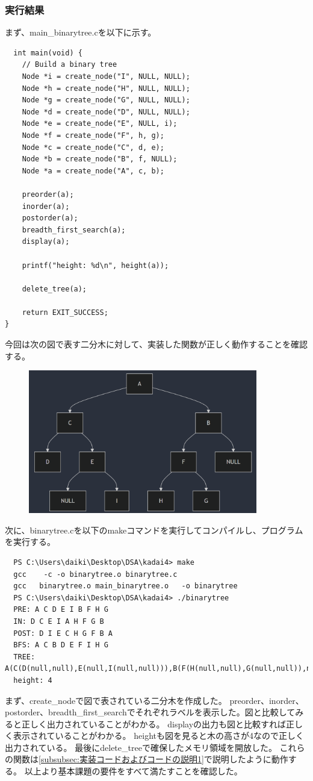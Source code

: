 \documentclass{ltjsarticle}
\begin{document}
\subsubsection{実行結果}\label{subsubsec:実行結果1}
まず、main\_binarytree.cを以下に示す。
\begin{lstlisting}
  int main(void) {
    // Build a binary tree
    Node *i = create_node("I", NULL, NULL);
    Node *h = create_node("H", NULL, NULL);
    Node *g = create_node("G", NULL, NULL);
    Node *d = create_node("D", NULL, NULL);
    Node *e = create_node("E", NULL, i);
    Node *f = create_node("F", h, g);
    Node *c = create_node("C", d, e);
    Node *b = create_node("B", f, NULL);
    Node *a = create_node("A", c, b);

    preorder(a);
    inorder(a);
    postorder(a);
    breadth_first_search(a);
    display(a);

    printf("height: %d\n", height(a));

    delete_tree(a);

    return EXIT_SUCCESS;
}
\end{lstlisting}
今回は次の図で表す二分木に対して、実装した関数が正しく動作することを確認する。
\begin{figure}[htbp]
  \begin{center}
      \includegraphics[width = 100mm]{binarytree.png}
  \end{center}
\end{figure}
次に、binarytree.cを以下のmakeコマンドを実行してコンパイルし、プログラムを実行する。
\begin{lstlisting}
  PS C:\Users\daiki\Desktop\DSA\kadai4> make
  gcc    -c -o binarytree.o binarytree.c
  gcc   binarytree.o main_binarytree.o   -o binarytree
  PS C:\Users\daiki\Desktop\DSA\kadai4> ./binarytree
  PRE: A C D E I B F H G 
  IN: D C E I A H F G B
  POST: D I E C H G F B A
  BFS: A C B D E F I H G
  TREE: A(C(D(null,null),E(null,I(null,null))),B(F(H(null,null),G(null,null)),null))
  height: 4
\end{lstlisting}
まず、create\_nodeで図で表されている二分木を作成した。
preorder、inorder、postorder、breadth\_first\_searchでそれぞれラベルを表示した。図と比較してみると正しく出力されていることがわかる。
displayの出力も図と比較すれば正しく表示されていることがわかる。
heightも図を見ると木の高さが4なので正しく出力されている。
最後にdelete\_treeで確保したメモリ領域を開放した。
これらの関数は\ref{subsubsec:実装コードおよびコードの説明1}で説明したように動作する。
以上より基本課題の要件をすべて満たすことを確認した。
\end{document}
